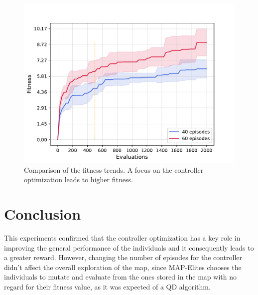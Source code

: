 \begin{figure}[h]
    \centering
    \includegraphics[scale=0.65]{images/brain_opt/walker/comp_40_60eps_ft}
    \caption{Comparison of the fitness trends. A focus on the controller optimization leads to higher fitness.}
    \label{fig:fitness_trend}
\end{figure}


\section{Conclusion}
This experiments confirmed that the controller optimization has a key role in improving the general performance of the individuals and it consequently leads to a greater reward. However, changing the number of episodes for the controller didn't affect the overall exploration of the map, since MAP-Elites chooses the individuals to mutate and evaluate from the ones stored in the map with no regard for their fitness value, as it was expected of a QD algorithm.


\newpage